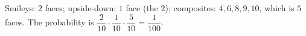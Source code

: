 Smileys: $2$ faces; upside-down: $1$ face (the $2$); composites: $4,6,8,9,10$, which is $5$ faces. The probability is $\dfrac2{10}\cdot\dfrac1{10}\cdot\dfrac5{10}=\boxed{\dfrac1{100}}$.
